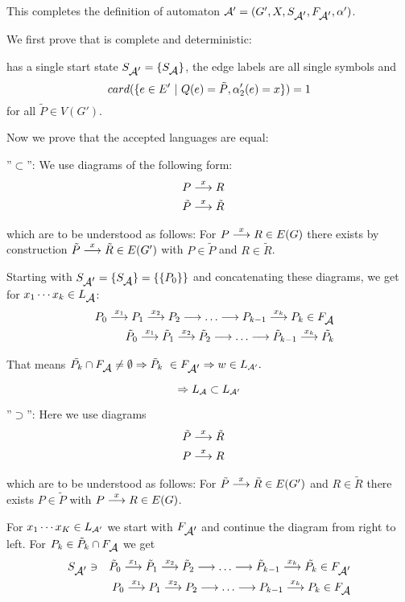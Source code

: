 This completes the definition of automaton $\mbox{$\mathcal{A'}$} = (G', X,
S_{\mbox{$\mathcal{A'}$}}, F_{\mbox{$\mathcal{A'}$}}, \alpha')$.

We first prove that
 is complete and deterministic:

 has a single start state $S_{\mbox{$\mathcal{A'}$}} = \{ S_{\mbox{$\mathcal{A}$}}
\}$, the edge labels are all single symbols and 
\[ card(\{ e \in E' \ |\  Q(e) = \tilde{P}, \alpha'_2(e) = x \}) = 1 \]
for all $\tilde{P} \in V(G')$.

Now we prove that the accepted languages are equal:

''$\subset$'': We use diagrams of the following form:
\begin{eqnarray*}
& P \stackrel{x}{\longrightarrow} R & \\
& \tilde{P} \stackrel{x}{\longrightarrow} \tilde{R} &
\end{eqnarray*}

which are to be understood as follows: For $P \stackrel{x}{\longrightarrow} R \in E(G)$
there exists by construction $\tilde{P} \stackrel{x}{\longrightarrow} \tilde{R} \in
E(G')$ with $P \in \tilde{P}$ and $R \in \tilde{R}$.

Starting with $S_{\mbox{$\mathcal{A'}$}} = \{ S_{\mbox{$\mathcal{A}$}} \} = \{ \{ P_0 \} \}$ and
concatenating these diagrams, we get for $x_1 \cdots x_k \in
L_{\mbox{$\mathcal{A}$}}$:
\begin{eqnarray*}
 & & P_0 \stackrel{x_1}{\longrightarrow} P_1 \stackrel{x_2}{\longrightarrow} P_2 \stackrel{}{\longrightarrow} \ldots \stackrel{}{\longrightarrow} P_{k-1} \stackrel{x_k}{\longrightarrow}
 P_k \in F_{\mbox{$\mathcal{A}$}} \\
 & & \tilde{P}_0 \stackrel{x_1}{\longrightarrow} \tilde{P}_1 \stackrel{x_2}{\longrightarrow} \tilde{P}_2 \stackrel{}{\longrightarrow} \ldots
 \stackrel{}{\longrightarrow} \tilde{P}_{k-1} \stackrel{x_k}{\longrightarrow} \tilde{P_k}
\end{eqnarray*}

That means $\tilde{P_k} \cap F_{\mbox{$\mathcal{A}$}} \neq \emptyset \Rightarrow \tilde{P}_k \
\in F_{\mbox{$\mathcal{A'}$}} \Rightarrow w \in \mbox{$L_{\mathcal{A'}}$}.$

\[ \Rightarrow \mbox{$L_{\mathcal{A}}$} \subset \mbox{$L_{\mathcal{A'}}$}\]

''$\supset$'': Here we use diagrams  
\begin{eqnarray*}
& \tilde{P} \stackrel{x}{\longrightarrow} \tilde{R} & \\
& P \stackrel{x}{\longrightarrow} R & 
\end{eqnarray*}

which are to be understood as follows: For $\tilde{P} \stackrel{x}{\longrightarrow} \tilde{R} \in
E(G')$ and $R \in \tilde{R}$ there exists $P \in \tilde{P}$ with $P \stackrel{x}{\longrightarrow} R
\in E(G)$.

For $x_1 \cdots x_K \in \mbox{$L_{\mathcal{A'}}$}$ we start with $F_{\mbox{$\mathcal{A'}$}}$ and continue
the diagram from right to left. For $P_k \in \tilde{P}_k \cap F_{\mbox{$\mathcal{A}$}}$ we get
\begin{eqnarray*}
 & S_{\mbox{$\mathcal{A'}$}} \ni & \tilde{P}_0 \stackrel{x_1}{\longrightarrow} \tilde{P}_1 \stackrel{x_2}{\longrightarrow} \tilde{P}_2 \stackrel{}{\longrightarrow} \ldots
 \stackrel{}{\longrightarrow} \tilde{P}_{k-1} \stackrel{x_k}{\longrightarrow} \tilde{P_k} \in F_{\mbox{$\mathcal{A'}$}} \\
 & & P_0 \stackrel{x_1}{\longrightarrow} P_1 \stackrel{x_2}{\longrightarrow} P_2 \stackrel{}{\longrightarrow} \ldots \stackrel{}{\longrightarrow}
 P_{k-1} \stackrel{x_k}{\longrightarrow} P_k \in F_{\mbox{$\mathcal{A}$}} 
\end{eqnarray*}

